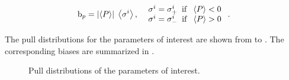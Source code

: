 \begin{equation}
{\rm b}_p = \left|\left<P\right>\right| \; \left<\sigma^i\right>,\;\; \left.
  \begin{array}{ll}
    \sigma^i = \sigma^i_+ \;\;{\rm if}\;\; \left<P\right> < 0 \\
    \sigma^i = \sigma^i_- \;\;{\rm if}\;\; \left<P\right> > 0
  \end{array} \right. .
\label{bias_def}
\end{equation}

The pull distributions for the parameters of interest are shown from  to .
The corresponding biases are summarized in .

\begin{figure}[!t]
  \centering
  \begin{subfigure}{0.5\textwidth}
    \raggedright
    \scalebox{0.56}{}
    \caption{}
    \label{pull_f0}
  \end{subfigure}%
  \hfill%
  \begin{subfigure}{0.5\textwidth}
    \raggedleft
    \scalebox{0.56}{}
    \caption{}
    \label{pull_fpar}
  \end{subfigure}
  \begin{subfigure}{0.5\textwidth}
    \raggedright
    \scalebox{0.56}{}
    \caption{}
    \label{pull_AparPhase}
  \end{subfigure}%
  \hfill%
  \begin{subfigure}{0.5\textwidth}
    \raggedleft
    \scalebox{0.56}{}
    \caption{}
    \label{pull_AperpPhase}
  \end{subfigure}
\caption{Pull distributions of the \pwave parameters of interest.}
\label{pull_pwave}
\end{figure}


